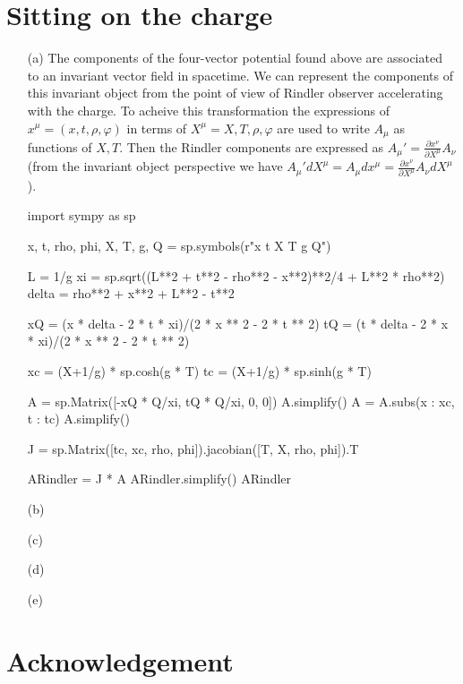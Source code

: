 \documentclass[10pt, a4paper]{article}
\begin{document}
\section{Sitting on the charge}
\begin{enumerate}
  \item[(a)] The components of the four-vector potential found above are associated to an invariant vector field in spacetime. We can represent the components of this invariant object from the point of view of Rindler observer accelerating with the charge. To acheive this transformation the expressions of $x^{\mu} = (x, t, \rho, \varphi)$ in terms of $X^{\mu} = X, T, \rho, \varphi$ are used to write $A_\mu$ as functions of $X, T$. Then the Rindler components are expressed as $A_\mu' = \frac{\partial x^\nu}{\partial X^{\mu}} A_\nu$ (from the invariant object perspective we have $A_\mu' dX^{\mu} = A_\mu dx^{\mu} =  \frac{\partial x^\nu}{\partial X^{\mu}} A_\nu dX^{\mu}$). 
  \begin{python}
import sympy as sp 

x, t, rho, phi, X, T, g, Q = sp.symbols(r"x t \rho \varphi X T g Q")

L = 1/g
xi = sp.sqrt((L**2 + t**2 - rho**2 - x**2)**2/4 + L**2 * rho**2)
delta = rho**2 + x**2 + L**2 - t**2

xQ = (x * delta - 2 * t * xi)/(2 * x ** 2 - 2 * t ** 2)
tQ = (t * delta - 2 * x * xi)/(2 * x ** 2 - 2 * t ** 2)

xc = (X+1/g) * sp.cosh(g * T)
tc = (X+1/g) * sp.sinh(g * T)

A = sp.Matrix([-xQ * Q/xi, tQ * Q/xi, 0, 0])
A.simplify()
A = A.subs({x : xc, t : tc})
A.simplify()

J = sp.Matrix([tc, xc, rho, phi]).jacobian([T, X, rho, phi]).T

ARindler = J * A
ARindler.simplify()
ARindler
  \end{python}
  \item[(b)] 
  \item[(c)]
  \item[(d)]
  \item[(e)]   
\end{enumerate}  

\section{Acknowledgement}



\makereferences


\end{document}
